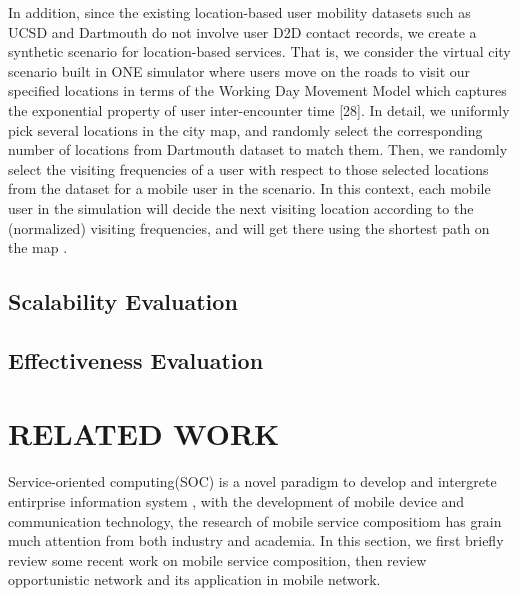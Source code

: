 \documentclass[10pt,journal,compsoc]{IEEEtran}
\begin{document}
In addition, since the existing location-based user mobility datasets such as UCSD and Dartmouth do not involve user D2D contact records, we create a synthetic scenario for location-based services. That is, we consider the virtual city scenario built in ONE simulator where users move on the roads to visit our specified locations in terms of the Working Day Movement Model which captures the exponential property of user inter-encounter time [28]. In detail, we uniformly pick several locations in the city map, and randomly select the corresponding number of locations from Dartmouth dataset to match them. Then, we randomly select the visiting frequencies of a user with respect to those selected locations from the dataset for a mobile user in the scenario. In this context, each mobile user in the simulation will decide the next visiting location according to the (normalized) visiting frequencies, and will get there using the shortest path on the map \cite{Deng2017}.
\subsection{Scalability Evaluation}
\subsection{Effectiveness Evaluation}

\section{RELATED WORK}
Service-oriented computing(SOC) is a novel paradigm to develop and intergrete entirprise information system \cite{}, with the development of mobile device and communication technology, the research of mobile service compositiom has grain much attention from both industry and academia. In this section, we first briefly review some recent work on mobile service composition, then review opportunistic network and its application in mobile network.
\end{document}
